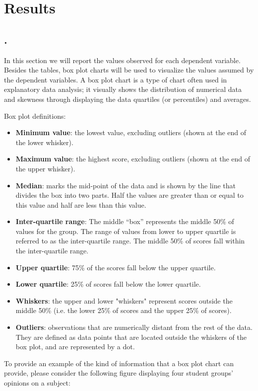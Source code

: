 \section{Results}
\subsection{.}
In this section we will report the values observed for each dependent variable.
Besides the tables, box plot charts will be used to visualize the values assumed by the dependent variables.
A box plot chart is a type of chart often used in explanatory data analysis; it visually shows the distribution of numerical data and skewness through displaying the data quartiles (or percentiles) and averages.

Box plot definitions:
\begin{itemize}
    \item \textbf{Minimum value}: the lowest value, excluding outliers (shown at the end of the lower whisker).
    \item \textbf{Maximum value}: the highest score, excluding outliers (shown at the end of the upper whisker).
    \item \textbf{Median}: marks the mid-point of the data and is shown by the line that divides the box into two parts. Half the values are greater than or equal to this value and half are less than this value.
    \item \textbf{Inter-quartile range}: The middle “box” represents the middle 50\% of values for the group. The range of values from lower to upper quartile is referred to as the inter-quartile range. The middle 50\% of scores fall within the inter-quartile range.
    \item \textbf{Upper quartile}: 75\% of the scores fall below the upper quartile.
    \item \textbf{Lower quartile}: 25\% of scores fall below the lower quartile.
    \item \textbf{Whiskers}: the upper and lower "whiskers" represent scores outside the middle 50\% (i.e. the lower 25\% of scores and the upper 25\% of scores).
    \item \textbf{Outliers}: observations that are numerically distant from the rest of the data. They are defined as data points that are located outside the whiskers of the box plot, and are represented by a dot.
\end{itemize}

\noindent To provide an example of the kind of information that a box plot chart can provide, please consider the following figure displaying four student groups' opinions on a subject:

